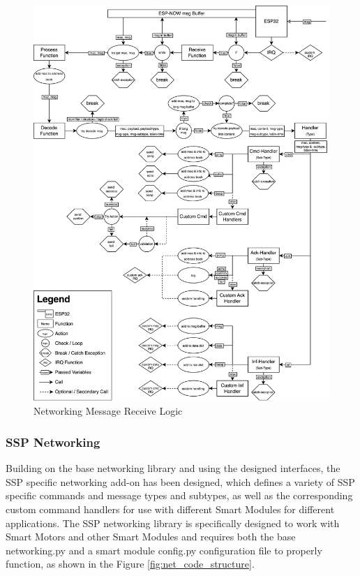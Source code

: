 \begin{figure}[H]
    \centering
    \includegraphics[width=\linewidth]{overleaf/images/receive_logic.drawio.png}
    \vspace{\ftspace}
    \caption{Networking Message Receive Logic}
    \label{fig:net_recv_logic}
\end{figure}


\subsubsection{\label{sec:methods_ssp_networking}SSP Networking}

Building on the base networking library and using the designed interfaces, the SSP specific networking add-on has been designed, which defines a variety of SSP specific commands and message types and subtypes, as well as the corresponding custom command handlers for use with different Smart Modules for different applications. The SSP networking library is specifically designed to work with Smart Motors and other Smart Modules and requires both the base networking.py and a smart module config.py configuration file to properly function, as shown in the Figure \ref{fig:net_code_structure}.

